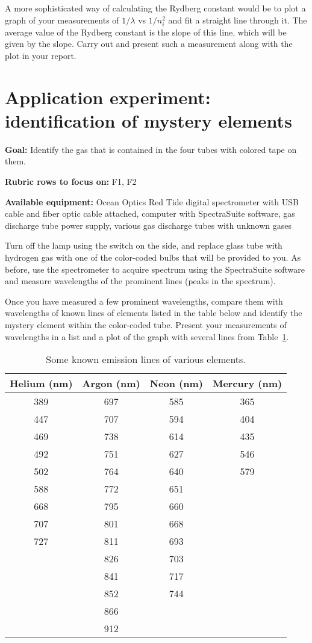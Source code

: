 A more sophisticated way of calculating the Rydberg constant would be to plot a graph of
your measurements of $1/\lambda$ vs $1/n_i^2$ and fit a straight line through it. The
average value of the Rydberg constant is the slope of this line, which will be given by the
slope. Carry out and present such a measurement along with the plot in your report.

\section{Application experiment: identification of mystery elements}

\textbf{Goal:} Identify the gas that is contained in the four tubes with colored tape on them.

\textbf{Rubric rows to focus on:} F1, F2

\textbf{Available equipment:} Ocean Optics Red Tide digital spectrometer with USB cable and fiber optic cable attached, computer with SpectraSuite software, gas discharge tube power supply, various gas discharge tubes with unknown gases

Turn off the lamp using the switch on the side, and replace glass tube with hydrogen gas
with one of the color-coded bulbs that will be provided to you. As before, use the
spectrometer to acquire spectrum using the SpectraSuite software and measure
wavelengths of the prominent lines (peaks in the spectrum).

Once you have measured a few prominent wavelengths, compare them with wavelengths
of known lines of elements listed in the table below and identify the mystery element
within the color-coded tube. Present your measurements of wavelengths in a list and a
plot of the graph with several lines from Table~\ref{spec:tab:emissions}.

\begin{table}
	\centering
	\begin{tabular}{c|c|c|c}
		\toprule
		\textbf{Helium (nm)} & \textbf{Argon (nm)} & \textbf{Neon (nm)} & \textbf{Mercury (nm)} \\ \midrule
		389 & 697 & 585 & 365 \\
		447 & 707 & 594 & 404 \\
		469 & 738 & 614 & 435 \\
		492 & 751 & 627 & 546 \\
		502 & 764 & 640 & 579 \\
		588 & 772 & 651 & \\
		668 & 795 & 660 & \\
		707 & 801 & 668 & \\
		727 & 811 & 693 & \\
		& 826 & 703 & \\
		& 841 & 717 & \\
		& 852 & 744 & \\
		& 866 & & \\
		& 912 & & \\ \bottomrule
	\end{tabular}
	\caption{Some known emission lines of various elements.}\label{spec:tab:emissions}
\end{table}

